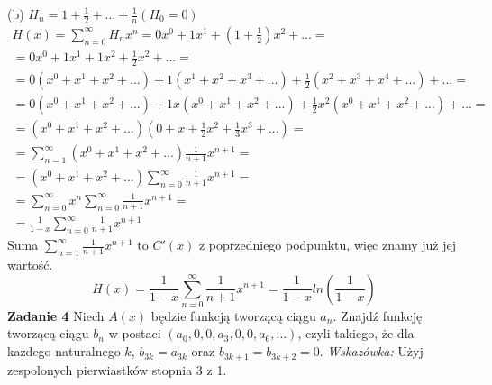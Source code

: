 \documentclass[12pt,a4paper]{article}
\begin{document}
(b) \( H_n = 1 + \frac{1}{2} + ... + \frac{1}{n} (H_0 = 0)\)
\begin{gather*}
	H(x) = \sum_{n=0}^\infty H_nx^n = 0x^0 + 1x^1 + (1+\frac{1}{2})x^2 + ... = \\
	= 0x^0 + 1x^1 + 1x^2 + \frac{1}{2} x^2 + ... = \\
	= 0(x^0 + x^1 + x^2 + ...) + 1(x^1 + x^2 + x^3 + ...) + \frac{1}{2} (x^2 + x^3 + x^4 + ...)+ ...=\\  = 0(x^0 + x^1 + x^2 + ...) + 1x(x^0 + x^1 + x^2 + ...) + \frac{1}{2} x^2(x^0 + x^1 + x^2 + ...)+ ... =\\ = (x^0 + x^1 + x^2 + ...)(0 + x + \frac{1}{2}x^2 + \frac{1}{3}x^3 + ...) = \\
	= \sum_{n=1}^\infty (x^0 + x^1 + x^2 + ...)\frac{1}{n+1}x^{n+1} = \\
	= (x^0 + x^1 + x^2 + ...)\sum_{n=0}^\infty \frac{1}{n+1}x^{n+1} = \\
	= \sum_{n=0}^\infty x^n \sum_{n=0}^\infty \frac{1}{n+1}x^{n+1} = \\
	= \frac{1}{1-x} \sum_{n=0}^\infty \frac{1}{n+1}x^{n+1}
\end{gather*}
Suma \( \sum_{n=1}^\infty \frac{1}{n+1}x^{n+1} \) to \( C'(x) \) z poprzedniego podpunktu, więc znamy już jej wartość.
\[
	H(x)= \frac{1}{1-x} \sum_{n=0}^\infty \frac{1}{n+1}x^{n+1} 
	= \frac{1}{1-x} ln\left( \frac{1}{1-x} \right)
\]
\vskip 0.5cm
\noindent
\textbf{Zadanie 4} Niech \( A(x) \) będzie funkcją tworzącą ciągu \(a_n\). Znajdź funkcję tworzącą ciągu \(b_n\) w postaci \( (a_0, 0, 0, a_3, 0, 0, a_6,...) \), czyli takiego, że dla każdego naturalnego \( k \), \(b_{3k} = a_{3k}\) oraz \( b_{3k+1} = b_{3k+2} = 0\).
\textit{Wskazówka:} Użyj zespolonych pierwiastków stopnia 3 z 1.
\end{document}

